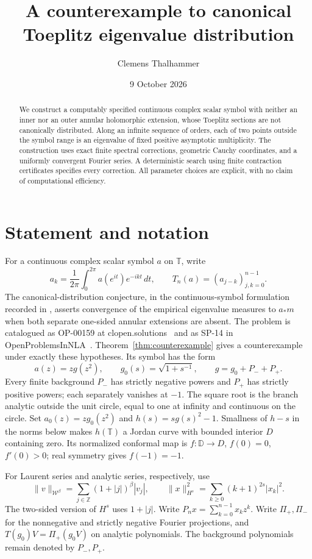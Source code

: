 \documentclass[11pt]{article}
\title{A counterexample to canonical Toeplitz eigenvalue distribution}
\author{Clemens Thalhammer}
\date{9 October 2026}
\newcommand{\T}{\mathbb T}
\begin{document}
\maketitle
\begin{abstract}
We construct a computably specified continuous complex scalar symbol
with neither an inner nor an outer annular holomorphic extension,
whose Toeplitz sections are not canonically distributed. Along an
infinite sequence of orders, each of two points outside the symbol
range is an eigenvalue of fixed positive asymptotic multiplicity.
The construction uses exact finite spectral corrections, geometric
Cauchy coordinates, and a uniformly convergent Fourier series.
A deterministic search using finite contraction certificates specifies
every correction. All parameter choices are explicit, with no claim
of computational efficiency.
\end{abstract}

\section{Statement and notation}
For a continuous complex scalar symbol $a$ on $\T$, write
\[
 a_k=\frac1{2\pi}\int_0^{2\pi}a(e^{it})e^{-ikt}\,dt,\qquad
 T_n(a)=(a_{j-k})_{j,k=0}^{n-1}.
\]
The canonical-distribution conjecture, in the continuous-symbol
formulation recorded in \cite[Section~1, p.~2]{BBG}, asserts convergence
of the empirical eigenvalue measures to $a_*m$ when both separate
one-sided annular extensions are absent. The problem is catalogued as
OP-00159 at clopen.solutions~\cite{Clopen} and as SP-14 in
OpenProblemsInNLA~\cite{OpenProblemsInNLA}.
Theorem~\ref{thm:counterexample}
gives a counterexample under exactly these hypotheses. Its symbol has the form
\[
 a(z)=zg(z^2),\qquad g_0(s)=\sqrt{1+s^{-1}},\qquad
 g=g_0+P_-+P_+.
\]
Every finite background $P_-$ has strictly negative powers and
$P_+$ has strictly positive powers; each separately vanishes at $-1$.
The square root is the branch analytic outside the unit circle,
equal to one at infinity and continuous on the circle.
Set $a_0(z)=zg_0(z^2)$ and $h(s)=sg(s)^2-1$.
Smallness of $h-s$ in the norms below makes $h(\T)$ a Jordan curve
with bounded interior $D$ containing zero.
Its normalized conformal map is $f:\mathbb D\to D$, $f(0)=0$,
$f'(0)>0$; real symmetry gives $f(-1)=-1$.

For Laurent series and analytic series, respectively, use
\[
 \|v\|_{\mathcal W^\beta}=\sum_{j\in\mathbb Z}
                 (1+|j|)^\beta|v_j|,\qquad
 \|x\|_{H^s}^2=\sum_{k\ge0}(k+1)^{2s}|x_k|^2.
\]
The two-sided version of $H^s$ uses $1+|j|$.
Write $P_nx=\sum_{k=0}^{n-1}x_kz^k$.
Write $\Pi_+,\Pi_-$ for the nonnegative and strictly negative
Fourier projections, and $T(g_0)V=\Pi_+(g_0V)$ on analytic
polynomials. The background polynomials remain denoted by $P_-,P_+$.
\end{document}
